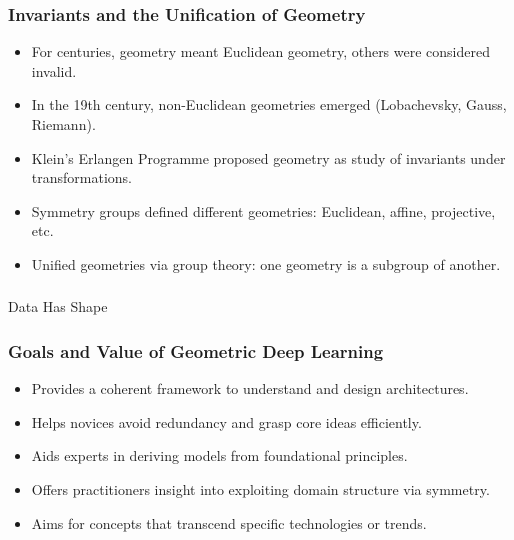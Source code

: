 

\begin{frame}[fragile]\frametitle{Invariants and the Unification of Geometry}
  \begin{itemize}
    \item For centuries, geometry meant Euclidean geometry, others were considered invalid.
    \item In the 19th century, non-Euclidean geometries emerged (Lobachevsky, Gauss, Riemann).
    \item Klein’s Erlangen Programme proposed geometry as study of invariants under transformations.
    \item Symmetry groups defined different geometries: Euclidean, affine, projective, etc.
    \item Unified geometries via group theory: one geometry is a subgroup of another.
  \end{itemize}
\end{frame}


\begin{frame}[fragile]\frametitle{}
\begin{center}
{\Large Data Has Shape}
\end{center}
\end{frame}

\begin{frame}[fragile]\frametitle{Goals and Value of Geometric Deep Learning}
  \begin{itemize}
    \item Provides a coherent framework to understand and design architectures.
    \item Helps novices avoid redundancy and grasp core ideas efficiently.
    \item Aids experts in deriving models from foundational principles.
    \item Offers practitioners insight into exploiting domain structure via symmetry.
    \item Aims for concepts that transcend specific technologies or trends.
  \end{itemize}
\end{frame}


